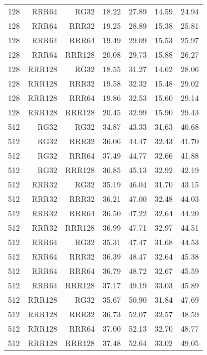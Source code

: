 \begin{table}
\begin{tabular}{|r|r|r|r|r|r|r|}
128 & RRR64 & RG32 & 18.22 & 27.89 & 14.59 & 24.94 \\
128 & RRR64 & RRR32 & 19.25 & 28.89 & 15.38 & 25.81 \\
128 & RRR64 & RRR64 & 19.49 & 29.09 & 15.53 & 25.97 \\
128 & RRR64 & RRR128 & 20.08 & 29.73 & 15.88 & 26.27 \\
128 & RRR128 & RG32 & 18.55 & 31.27 & 14.62 & 28.06 \\
128 & RRR128 & RRR32 & 19.58 & 32.32 & 15.48 & 29.02 \\
128 & RRR128 & RRR64 & 19.86 & 32.53 & 15.60 & 29.14 \\
128 & RRR128 & RRR128 & 20.45 & 32.99 & 15.90 & 29.43 \\
512 & RG32 & RG32 & 34.87 & 43.33 & 31.63 & 40.68 \\
512 & RG32 & RRR32 & 36.06 & 44.47 & 32.43 & 41.70 \\
512 & RG32 & RRR64 & 37.49 & 44.77 & 32.66 & 41.88 \\
512 & RG32 & RRR128 & 36.85 & 45.13 & 32.92 & 42.19 \\
512 & RRR32 & RG32 & 35.19 & 46.04 & 31.70 & 43.15 \\
512 & RRR32 & RRR32 & 36.21 & 47.00 & 32.48 & 44.03 \\
512 & RRR32 & RRR64 & 36.50 & 47.22 & 32.64 & 44.20 \\
512 & RRR32 & RRR128 & 36.99 & 47.71 & 32.97 & 44.51 \\
512 & RRR64 & RG32 & 35.31 & 47.47 & 31.68 & 44.53 \\
512 & RRR64 & RRR32 & 36.39 & 48.47 & 32.64 & 45.38 \\
512 & RRR64 & RRR64 & 36.79 & 48.72 & 32.67 & 45.59 \\
512 & RRR64 & RRR128 & 37.17 & 49.19 & 33.03 & 45.89 \\
512 & RRR128 & RG32 & 35.67 & 50.90 & 31.84 & 47.69 \\
512 & RRR128 & RRR32 & 36.73 & 52.07 & 32.57 & 48.59 \\
512 & RRR128 & RRR64 & 37.00 & 52.13 & 32.70 & 48.77 \\
512 & RRR128 & RRR128 & 37.48 & 52.64 & 33.02 & 49.05 \\
\hline
\end{tabular}
\end{table}


